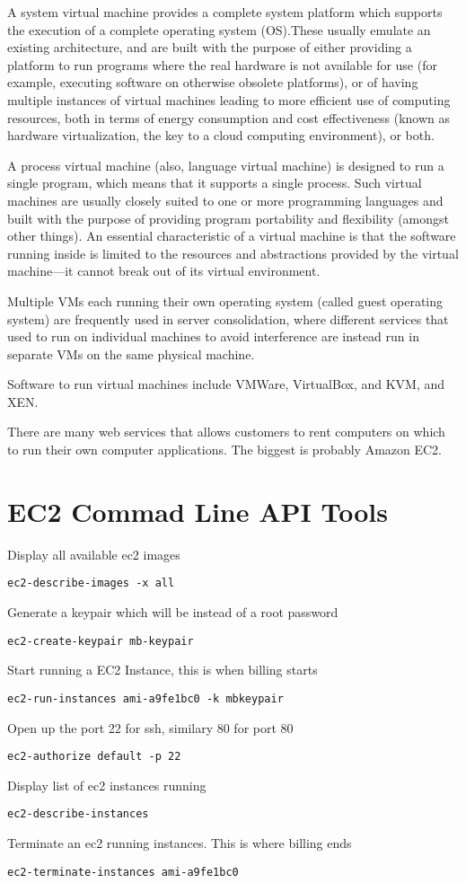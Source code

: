 \documentclass[justified,sixbynine]{tufte-book}
\theoremstyle{plain}%
\theoremstyle{definition}
\theoremstyle{remark}
\begin{document}
\begin{fullwidth}
A system virtual machine provides a complete system platform which supports the execution of a complete operating system (OS).These usually emulate an existing architecture, and are built with the purpose of either providing a platform to run programs where the real hardware is not available for use (for example, executing software on otherwise obsolete platforms), or of having multiple instances of virtual machines leading to more efficient use of computing resources, both in terms of energy consumption and cost effectiveness (known as hardware virtualization, the key to a cloud computing environment), or both.

A process virtual machine (also, language virtual machine) is designed to run a single program, which means that it supports a single process. Such virtual machines are usually closely suited to one or more programming languages and built with the purpose of providing program portability and flexibility (amongst other things). An essential characteristic of a virtual machine is that the software running inside is limited to the resources and abstractions provided by the virtual machine—it cannot break out of its virtual environment.

Multiple VMs each running their own operating system (called guest operating system) are frequently used in server consolidation, where different services that used to run on individual machines to avoid interference are instead run in separate VMs on the same physical machine.

Software to run virtual machines include VMWare, VirtualBox, and KVM, and XEN.

There are many web services that allows customers to rent computers on which to run their own computer applications.
The biggest is probably Amazon EC2.

\section{EC2 Commad Line API Tools}

Display all available ec2 images
\begin{verbatim}
ec2-describe-images -x all
\end{verbatim}
Generate a keypair which will be instead of a root password
\begin{verbatim}
ec2-create-keypair mb-keypair
\end{verbatim}
Start running a EC2 Instance, this is when billing starts
\begin{verbatim}
ec2-run-instances ami-a9fe1bc0 -k mbkeypair
\end{verbatim}
Open up the port 22 for ssh, similary 80 for port 80
\begin{verbatim}
ec2-authorize default -p 22
\end{verbatim}
Display list of ec2 instances running
\begin{verbatim}
ec2-describe-instances
\end{verbatim}
Terminate an ec2 running instances. This is where billing ends
\begin{verbatim}
ec2-terminate-instances ami-a9fe1bc0
\end{verbatim}


\end{fullwidth}
\end{document}
